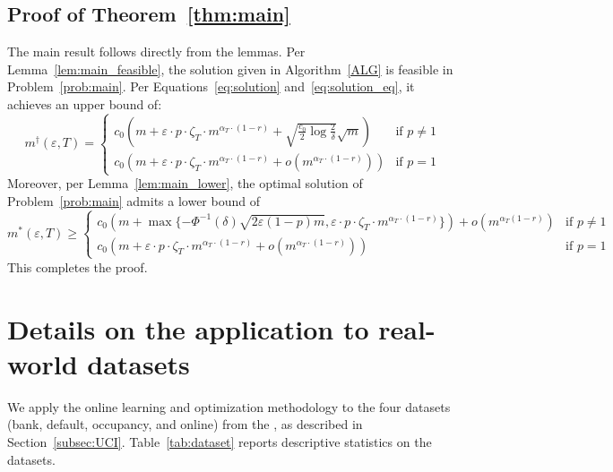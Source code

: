 \documentclass[nonblindrev]{informs3noheader}
\begin{document}
\subsection{Proof of Theorem~\ref{thm:main}}

The main result follows directly from the lemmas. Per Lemma~\ref{lem:main_feasible}, the solution given in Algorithm~\ref{ALG} is feasible in Problem~\eqref{prob:main}. Per Equations~\eqref{eq:solution} and~\eqref{eq:solution_eq}, it achieves an upper bound of:
$$m^\dagger(\varepsilon,T)=\begin{cases}
        c_0\left( m+\varepsilon\cdot p\cdot \zeta_T \cdot m^{\alpha_T\cdot(1-r)} +  \sqrt{\frac{c_0}{2}\log \frac{2}{\delta}}\sqrt{m}\right) &  \text{if }p\neq 1\\
   c_0\left( m+\varepsilon\cdot p\cdot \zeta_T \cdot m^{\alpha_T\cdot(1-r)} +  o\left(m^{\alpha_T\cdot(1-r)}\right)\right) &  \text{if }p=1
\end{cases}$$
 Moreover, per Lemma~\ref{lem:main_lower}, the optimal solution of Problem~\eqref{prob:main} admits a lower bound of
  \[m^*(\varepsilon, T) \geq   \begin{cases}
  c_0\left(m +\max\{-\Phi^{-1}(\delta)\sqrt{2\varepsilon(1-p)m},\varepsilon\cdot p\cdot\zeta_T\cdot m^{\alpha_T\cdot(1-r)}\}\right) +o\left(m^{\alpha_T(1-r)}\right)& \text{if }p \neq 1\\
      c_0\left(m + \varepsilon\cdot p\cdot\zeta_T\cdot m^{\alpha_T\cdot(1-r)} +  o\left(m^{\alpha_T\cdot(1-r)}\right)\right) & \text{if }p=1
  \end{cases}\]
This completes the proof.\hfill\Halmos

\section{Details on the application to real-world datasets}
\label{app:UCI}

We apply the online learning and optimization methodology to the four datasets (bank, default, occupancy, and online) from the \cite{UCI}, as described in Section~\ref{subsec:UCI}. Table~\ref{tab:dataset} reports descriptive statistics on the datasets.
\end{document}
